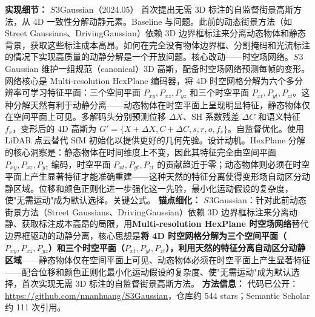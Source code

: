 \textbf{实现细节：} $S^{}3$Gaussian（2024.05） 首次提出无需 3D 标注的自监督街景高斯方法，从 4D 一致性分解动静元素。Baseline 与问题。此前的动态街景方法（如 Street Gaussians、DrivingGaussian）依赖 3D 边界框标注来分离动态物体和静态背景，获取这些标注成本高昂。如何在完全没有物体边界框、分割掩码和光流标注的情况下实现高质量的动静分解是一个开放问题。核心改动——时空场网络。$S^{}3$Gaussian 维护一组规范（canonical）3D 高斯，配备时空场网络预测每帧的变形。网络核心是 Multi-resolution HexPlane 编码器，将 4D 时空网格分解为六个多分辨率可学习特征平面：三个空间平面 $P_{xy}, P_{xz}, P_{yz}$ 和三个时空平面 $P_{xt}, P_{yt}, P_{zt}$。这种分解天然有利于动静分离——动态物体在时空平面上呈现明显特征，静态物体仅在空间平面上可见。多解码头分别预测位移 $\Delta X$、SH 系数残差 $\Delta C$ 和语义特征 $f_s$，变形后的 4D 高斯为 $G' = \{X + \Delta X, C + \Delta C, s, r, o, f_s\}$。自监督优化。使用 LiDAR 点云替代 SfM 初始化以提供更好的几何先验。设计动机。HexPlane 分解的核心洞察是：静态物体在时间维度上不变，因此其特征完全由空间平面 $P_{xy}, P_{xz}, P_{yz}$ 编码，时空平面 $P_{xt}, P_{yt}, P_{zt}$ 的贡献趋近于零；动态物体则必须在时空平面上产生显著特征才能准确重建——这种天然的特征分离使得变形场自动区分动静区域。位移和颜色正则化进一步强化这一先验，最小化运动假设的复杂度，使"无需运动"成为默认选择。关键公式。
\textbf{锚点细化：} $S^{}3$Gaussian：针对此前动态街景方法（Street Gaussians、DrivingGaussian）依赖 3D 边界框标注来分离动静、获取标注成本高昂的局限，用\textbf{Multi-resolution HexPlane 时空场网络}替代边界框驱动的动静分离，核心思想是\textbf{将 4D 时空网格分解为三个空间平面（$P_{xy}, P_{xz}, P_{yz}$）和三个时空平面（$P_{xt}, P_{yt}, P_{zt}$），利用天然的特征分离自动区分动静区域}——静态物体仅在空间平面上可见、动态物体必须在时空平面上产生显著特征——配合位移和颜色正则化最小化运动假设的复杂度、使"无需运动"成为默认选择，首次实现无需 3D 标注的自监督街景高斯方法。
\textbf{方法信息：} 代码已公开：\url{https://github.com/nnanhuang/S3Gaussian}，仓库约 544 stars；Semantic Scholar 约 111 次引用。



